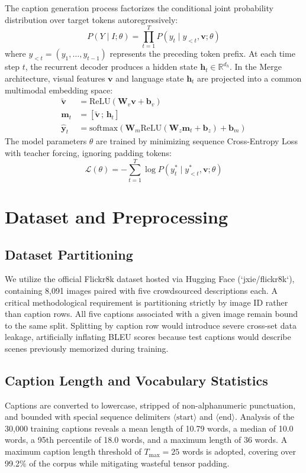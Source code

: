 \documentclass[conference]{IEEEtran}
\begin{document}
The caption generation process factorizes the conditional joint probability distribution over target tokens autoregressively:
\begin{equation}
P(Y \mid I; \theta) = \prod_{t=1}^T P(y_t \mid y_{<t}, \mathbf{v}; \theta)
\end{equation}
where $y_{<t} = (y_1, \dots, y_{t-1})$ represents the preceding token prefix. At each time step $t$, the recurrent decoder produces a hidden state $\mathbf{h}_t \in \mathbb{R}^{d_h}$. In the Merge architecture, visual features $\mathbf{v}$ and language state $\mathbf{h}_t$ are projected into a common multimodal embedding space:
\begin{align}
\tilde{\mathbf{v}} &= \text{ReLU}(\mathbf{W}_v \mathbf{v} + \mathbf{b}_v) \\
\mathbf{m}_t &= [\tilde{\mathbf{v}} \,;\, \mathbf{h}_t] \\
\hat{\mathbf{y}}_t &= \text{softmax}(\mathbf{W}_m \text{ReLU}(\mathbf{W}_z \mathbf{m}_t + \mathbf{b}_z) + \mathbf{b}_m)
\end{align}
The model parameters $\theta$ are trained by minimizing sequence Cross-Entropy Loss with teacher forcing, ignoring padding tokens:
\begin{equation}
\mathcal{L}(\theta) = - \sum_{t=1}^T \log P(y_t^* \mid y_{<t}^*, \mathbf{v}; \theta)
\end{equation}

\section{Dataset and Preprocessing}
\subsection{Dataset Partitioning}
We utilize the official Flickr8k dataset hosted via Hugging Face (`jxie/flickr8k`), containing 8,091 images paired with five crowdsourced descriptions each. A critical methodological requirement is partitioning strictly by image ID rather than caption rows. All five captions associated with a given image remain bound to the same split. Splitting by caption row would introduce severe cross-set data leakage, artificially inflating BLEU scores because test captions would describe scenes previously memorized during training.

\subsection{Caption Length and Vocabulary Statistics}
Captions are converted to lowercase, stripped of non-alphanumeric punctuation, and bounded with special sequence delimiters $\langle\text{start}\rangle$ and $\langle\text{end}\rangle$. Analysis of the 30,000 training captions reveals a mean length of 10.79 words, a median of 10.0 words, a 95th percentile of 18.0 words, and a maximum length of 36 words. A maximum caption length threshold of $T_{\max} = 25$ words is adopted, covering over 99.2\% of the corpus while mitigating wasteful tensor padding.
\end{document}
